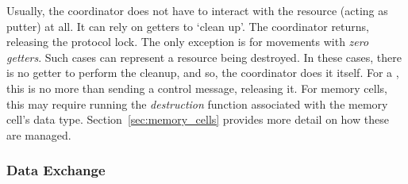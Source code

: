 \begin{enumerate}
	 Usually, the coordinator does not have to interact with the resource (acting as putter) at all. It can rely on getters to `clean up'. The coordinator returns, releasing the protocol lock. The only exception is for movements with \textit{zero getters}. Such cases can represent a resource being destroyed. In these cases, there is no getter to perform the cleanup, and so, the coordinator does it itself. For a , this is no more than sending a control message, releasing it. For memory cells, this may require running the \textit{destruction} function associated with the memory cell's data type.  Section~\ref{sec:memory_cells} provides more detail on how these are managed.
	 	
\end{enumerate}

\subsubsection{Data Exchange}
\label{sec:data_exchange}

